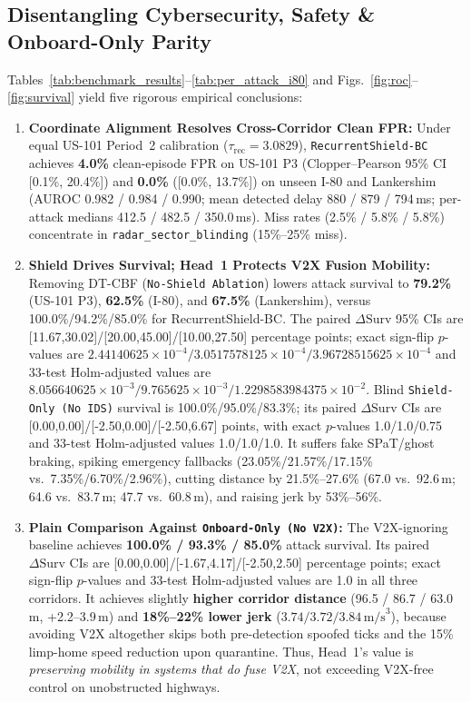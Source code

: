 \documentclass[journal]{IEEEtran}
\begin{document}
\subsection{Disentangling Cybersecurity, Safety \& Onboard-Only Parity}
Tables~\ref{tab:benchmark_results}--\ref{tab:per_attack_i80} and Figs.~\ref{fig:roc}--\ref{fig:survival} yield five rigorous empirical conclusions:
\begin{enumerate}
    \item \textbf{Coordinate Alignment Resolves Cross-Corridor Clean FPR:} Under equal US-101 Period~2 calibration ($\tau_{\text{rec}}=3.0829$), \texttt{RecurrentShield-BC} achieves \textbf{4.0\%} clean-episode FPR on US-101 P3 (Clopper--Pearson 95\% CI [0.1\%, 20.4\%]) and \textbf{0.0\%} ([0.0\%, 13.7\%]) on unseen I-80 and Lankershim (AUROC 0.982 / 0.984 / 0.990; mean detected delay 880 / 879 / 794\,ms; per-attack medians 412.5 / 482.5 / 350.0\,ms). Miss rates (2.5\% / 5.8\% / 5.8\%) concentrate in \texttt{radar\_sector\_blinding} (15\%--25\% miss).
    \item \textbf{Shield Drives Survival; Head~1 Protects V2X Fusion Mobility:} Removing DT-CBF (\texttt{No-Shield Ablation}) lowers attack survival to \textbf{79.2\%} (US-101 P3), \textbf{62.5\%} (I-80), and \textbf{67.5\%} (Lankershim), versus 100.0\%/94.2\%/85.0\% for RecurrentShield-BC. The paired $\Delta\text{Surv}$ 95\% CIs are [11.67,30.02]/[20.00,45.00]/[10.00,27.50] percentage points; exact sign-flip $p$-values are $2.44140625\times10^{-4}/3.0517578125\times10^{-4}/3.96728515625\times10^{-4}$ and 33-test Holm-adjusted values are $8.056640625\times10^{-3}/9.765625\times10^{-3}/1.2298583984375\times10^{-2}$. Blind \texttt{Shield-Only (No IDS)} survival is 100.0\%/95.0\%/83.3\%; its paired $\Delta\text{Surv}$ CIs are [0.00,0.00]/[-2.50,0.00]/[-2.50,6.67] points, with exact $p$-values 1.0/1.0/0.75 and 33-test Holm-adjusted values 1.0/1.0/1.0. It suffers fake SPaT/ghost braking, spiking emergency fallbacks (23.05\%/21.57\%/17.15\% vs.\ 7.35\%/6.70\%/2.96\%), cutting distance by 21.5\%--27.6\% (67.0 vs.\ 92.6\,m; 64.6 vs.\ 83.7\,m; 47.7 vs.\ 60.8\,m), and raising jerk by 53\%--56\%.
    \item \textbf{Plain Comparison Against \texttt{Onboard-Only (No V2X)}:} The V2X-ignoring baseline achieves \textbf{100.0\% / 93.3\% / 85.0\%} attack survival. Its paired $\Delta\text{Surv}$ CIs are [0.00,0.00]/[-1.67,4.17]/[-2.50,2.50] percentage points; exact sign-flip $p$-values and 33-test Holm-adjusted values are 1.0 in all three corridors. It achieves slightly \textbf{higher corridor distance} (96.5 / 86.7 / 63.0\,m, +2.2--3.9\,m) and \textbf{18\%--22\% lower jerk} ($3.74 / 3.72 / 3.84\,\text{m/s}^3$), because avoiding V2X altogether skips both pre-detection spoofed ticks and the 15\% limp-home speed reduction upon quarantine. Thus, Head~1's value is \textit{preserving mobility in systems that do fuse V2X}, not exceeding V2X-free control on unobstructed highways.

\end{enumerate}
\end{document}
